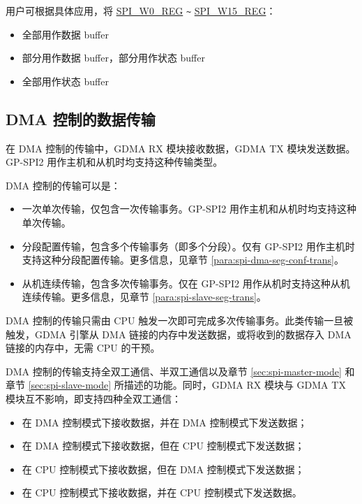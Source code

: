 \documentclass[main\_\_CN.tex]{subfiles}
\begin{document}
用户可根据具体应用，将 \hyperref[regdesc:SPIW0REG]{SPI\_W0\_REG} \verb+~+ \hyperref[regdesc:SPIW0REG]{SPI\_W15\_REG}：
\begin{itemize}
    \item 全部用作数据 buffer
    \item 部分用作数据 buffer，部分用作状态 buffer
    \item 全部用作状态 buffer
\end{itemize}



\subsection{DMA 控制的数据传输}\label{sec:spi-dma-controlled-data-transfer}

在 DMA 控制的传输中，GDMA RX 模块接收数据，GDMA TX 模块发送数据。GP-SPI2 用作主机和从机时均支持这种传输类型。

DMA 控制的传输可以是：

\begin{itemize}
    \item 一次单次传输，仅包含一次传输事务。GP-SPI2 用作主机和从机时均支持这种单次传输。
    \item 分段配置传输，包含多个传输事务（即多个分段）。仅有 GP-SPI2 用作主机时支持这种分段配置传输。更多信息，见章节  \ref{para:spi-dma-seg-conf-trans}。
    \item 从机连续传输，包含多次传输事务。仅在 GP-SPI2 用作从机时支持这种从机连续传输。更多信息，见章节  \ref{para:spi-slave-seg-trans}。
\end{itemize}

DMA 控制的传输只需由 CPU 触发一次即可完成多次传输事务。此类传输一旦被触发，GDMA 引擎从 DMA 链接的内存中发送数据，或将收到的数据存入 DMA 链接的内存中，无需 CPU 的干预。

DMA 控制的传输支持全双工通信、半双工通信以及章节 \ref{sec:spi-master-mode} 和章节 \ref{sec:spi-slave-mode} 所描述的功能。同时，GDMA RX 模块与 GDMA TX 模块互不影响，即支持四种全双工通信：

\begin{itemize}
    \item 在 DMA 控制模式下接收数据，并在 DMA 控制模式下发送数据；

    \item 在 DMA 控制模式下接收数据，但在 CPU 控制模式下发送数据；

    \item 在 CPU 控制模式下接收数据，但在 DMA 控制模式下发送数据；

    \item 在 CPU 控制模式下接收数据，并在 CPU 控制模式下发送数据。

\end{itemize}
\end{document}
